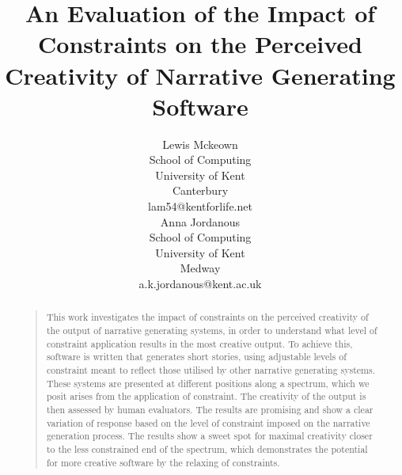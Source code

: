 \documentclass[letterpaper]{article}
\title{An Evaluation of the Impact of Constraints on the Perceived Creativity of Narrative Generating Software}
\author{Lewis Mckeown\\
School of Computing\\
University of Kent\\
Canterbury\\
lam54@kentforlife.net\\ 
\And Anna Jordanous\\
School of Computing\\
University of Kent\\
Medway\\
a.k.jordanous@kent.ac.uk\\
}
\begin{document}
 
\maketitle

\begin{abstract}
\begin{quote}
This work investigates the impact of constraints on the perceived creativity of the output of narrative generating systems, in order to understand what level of constraint application results in the most creative output. To achieve this, software is written that generates short stories, using adjustable levels of constraint meant to reflect those utilised by other narrative generating systems. These systems are presented at different positions along a spectrum, which we posit arises from the application of constraint. The creativity of the output is then assessed by human evaluators. The results are promising and show a clear variation of response based on the level of constraint imposed on the narrative generation process. The results show a sweet spot for maximal creativity closer to the less constrained end of the spectrum, which demonstrates the potential for more creative software by the relaxing of constraints. \end{quote}
\end{abstract}

\end{document}
